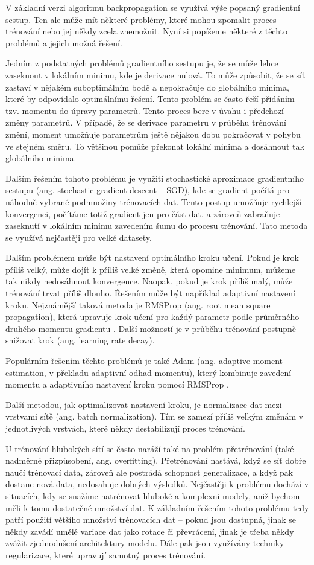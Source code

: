 V základní verzi algoritmu backpropagation se využívá výše popsaný gradientní
sestup. Ten ale může mít některé problémy, které mohou zpomalit proces
trénování nebo jej někdy zcela znemožnit. Nyní si popíšeme některé z těchto
problémů a jejich možná řešení.

Jedním z podstatných problémů gradientního sestupu je, že se může lehce
zaseknout v lokálním minimu, kde je derivace nulová. To může způsobit, že se
síť zastaví v nějakém suboptimálním bodě a nepokračuje do globálního minima,
které by odpovídalo optimálnímu řešení. Tento problém se často řeší přidáním
tzv. momentu do úpravy parametrů. Tento proces bere v úvahu i předchozí změny
parametrů. V případě, že se derivace parametru v průběhu trénování změní,
moment umožňuje parametrům ještě nějakou dobu pokračovat v pohybu ve stejném
směru. To většinou pomůže překonat lokální minima a dosáhnout tak globálního
minima.

Dalším řešením tohoto problému je využití stochastické aproximace gradientního
sestupu (ang. stochastic gradient descent – SGD), kde se gradient počítá pro
náhodně vybrané podmnožiny trénovacích dat. Tento postup umožňuje rychlejší
konvergenci, počítáme totiž gradient jen pro část dat, a zároveň zabraňuje
zaseknutí v lokálním minimu zavedením šumu do procesu trénování. Tato metoda se
využívá nejčastěji pro velké datasety.

Dalším problémem může být nastavení optimálního kroku učení. Pokud je krok
příliš velký, může dojít k příliš velké změně, která opomine minimum, můžeme
tak nikdy nedosáhnout konvergence. Naopak, pokud je krok příliš malý, může
trénování trvat příliš dlouho. Řešením může být například adaptivní nastavení
kroku. Nejznámější taková metoda je RMSProp (ang. root mean square
propagation), která upravuje krok učení pro každý parametr podle průměrného
druhého momentu gradientu \cite{RMSProp}. Další možností je v průběhu trénování
postupně snižovat krok (ang. learning rate decay).

Populárním řešením těchto problémů je také Adam (ang. adaptive moment
estimation, v překladu adaptivní odhad momentu), který kombinuje zavedení
momentu a adaptivního nastavení kroku pomocí RMSProp \cite{adam}.

Další metodou, jak optimalizovat nastavení kroku, je normalizace dat mezi
vrstvami sítě (ang. batch normalization). Tím se zamezí příliš velkým změnám v
jednotlivých vrstvách, které někdy destabilizují proces trénování.

U trénování hlubokých sítí se často naráží také na problém přetrénování (také
nadměrné přizpůsobení, ang. overfitting). Přetrénování nastává, když se síť
dobře naučí trénovací data, zároveň ale postrádá schopnost generalizace, a když
pak dostane nová data, nedosahuje dobrých výsledků. Nejčastěji k problému
dochází v situacích, kdy se snažíme natrénovat hluboké a komplexni modely, aniž
bychom měli k tomu dostatečné množství dat. K základním řešením tohoto problému
tedy patří použití většího množství trénovacích dat – pokud jsou dostupná,
jinak se někdy zavádí umělé variace dat jako rotace či převrácení, jinak je
třeba někdy zvážit zjednodušení architektury modelu. Dále pak jsou využívány
techniky regularizace, které upravují samotný proces trénování.

